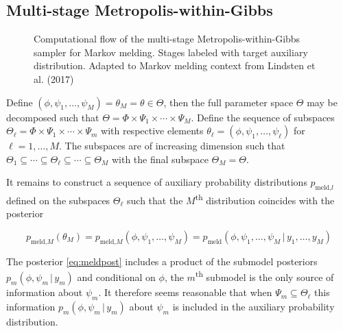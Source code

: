 \documentclass[11pt,]{book}
\begin{document}
\subsection{Multi-stage
Metropolis-within-Gibbs}\label{multi-stage-metropolis-within-gibbs}

\begin{figure}
\centering
{}
\caption{Computational flow of the multi-stage Metropolis-within-Gibbs sampler for Markov melding. Stages labeled with target auxiliary distribution. Adapted to Markov melding context from Lindsten et al. (2017)}
\label{fig:compflow}
\end{figure}

Define
\((\phi, \psi_1, \ldots, \psi_M) = \theta_M = \theta \in \Theta\), then
the full parameter space \(\Theta\) may be decomposed such that
\(\Theta = \Phi \times \Psi_1 \times \cdots \times \Psi_M\). Define the
sequence of subspaces
\(\Theta_\ell = \Phi \times \Psi_1 \times \cdots \times \Psi_m\) with
respective elements \(\theta_\ell = (\phi, \psi_1, \ldots, \psi_\ell)\)
for \(\ell = 1, \ldots, M\). The subspaces are of increasing dimension
such that
\(\Theta_1 \subseteq \cdots \subseteq \Theta_\ell \subseteq \cdots \subseteq \Theta_M\)
with the final subspace \(\Theta_M = \Theta\).

It remains to construct a sequence of auxiliary probability
distributions \(p_{\text {meld,}l}\) defined on the subspaces
\(\Theta_\ell\) such that the \(M\)\textsuperscript{th} distribution
coincides with the posterior

\begin{equation}
p_{\text {meld,}M}(\theta_M) = p_{\text {meld,}M}(\phi, \psi_1, \ldots, \psi_M) = p_{\text{meld}}(\phi, \psi_1, \ldots, \psi_M \, | \, y_1, \ldots, y_M) \label{eq:Mthstage}
\end{equation}

The posterior \eqref{eq:meldpost} includes a product of the submodel
posteriors \(p_m(\phi, \psi_m \, | \, y_m)\) and conditional on
\(\phi\), the \(m\)\textsuperscript{th} submodel is the only source of
information about \(\psi_m\). It therefore seems reasonable that when
\(\Psi_m \subseteq \Theta_\ell\) this information
\(p_m(\phi, \psi_m \, | \, y_m)\) about \(\psi_m\) is included in the
auxiliary probability distribution.
\end{document}
